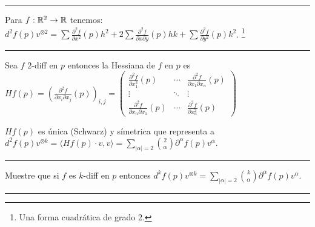 \E \newpage 

\hrule 
\begin{example}
    Para \(f:\mathbb{R}^2\rightarrow \mathbb{R}\) tenemos: \( d^2f(p)v^{\otimes 2} = \sum\frac{\partial^2 f}{\partial x^2}(p)h^2 + 2\sum \frac{\partial^2 f }{\partial x\partial y}(p)hk+ \sum\frac{\partial^2 f}{\partial y^2}(p)k^2\). \footnote{Una forma cuadrática de grado 2.} 
\end{example}
\hrule 

\E

\begin{definition}
    Sea \(f\) \(2\)-diff en \(p\) entonces la Hessiana de \(f\) en \(p\) es \( Hf(p)= \left(\frac{\partial^2 f}{\partial x_i\partial x_j}(p)\right)_{i,j} =  \begin{pmatrix}
        \frac{\partial^2 f }{\partial x_1^2}(p) & \cdots &  \frac{\partial^2 f }{\partial x_1 \partial x_n}(p) \\
        \vdots & \ddots & \vdots \\
        \frac{\partial^2 f }{\partial x_n \partial x_1}(p) & \cdots & \frac{\partial^2 f }{\partial x_n^2}(p)
    \end{pmatrix}\)
\end{definition}
\begin{note}
    \(Hf(p)\) es única (Schwarz) y símetrica que representa a \(d^2f(p)v^{\otimes k} = \langle Hf(p)\cdot v, v\rangle = \displaystyle \sum_{|\alpha|=2} \binom{2}{\alpha}\partial^\alpha f(p)v^\alpha. \)
\end{note}

\E 

\hrule 
\begin{exercise}
    Muestre que si \(f\) es \(k\)-diff en \(p\) entonces \(d^kf(p)v^{\otimes k} =\displaystyle \sum_{|\alpha|=2} \binom{k}{\alpha}\partial^\alpha f(p)v^\alpha\). 
\end{exercise}
\hrule 
 

